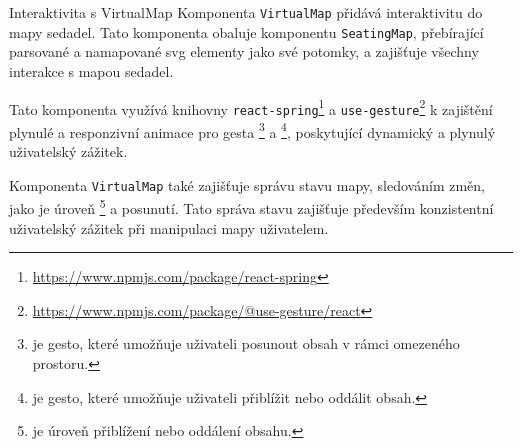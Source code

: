 \begin{subsection}{Interaktivita s VirtualMap}
    \label{subsec:implementace-seating-virtualmap}
    Komponenta \texttt{VirtualMap} přidává interaktivitu do mapy sedadel.
    Tato komponenta obaluje komponentu \texttt{SeatingMap}, přebírající parsované a namapované \ac{svg} elementy jako své potomky, a zajišťuje všechny interakce s mapou sedadel.

    Tato komponenta využívá knihovny \texttt{react-spring}\footnote{\url{https://www.npmjs.com/package/react-spring}} a \texttt{use-gesture}\footnote{\url{https://www.npmjs.com/package/@use-gesture/react}} k zajištění plynulé a responzivní animace pro gesta \footnote{ je gesto, které umožňuje uživateli posunout obsah v rámci omezeného prostoru.} a \footnote{ je gesto, které umožňuje uživateli přiblížit nebo oddálit obsah.
    }, poskytující dynamický a plynulý uživatelský zážitek.

    Komponenta \texttt{VirtualMap} také zajišťuje správu stavu mapy, sledováním změn, jako je úroveň \footnote{ je úroveň přiblížení nebo oddálení obsahu.} a posunutí.
    Tato správa stavu zajišťuje především konzistentní uživatelský zážitek při manipulaci mapy uživatelem.
\end{subsection}

